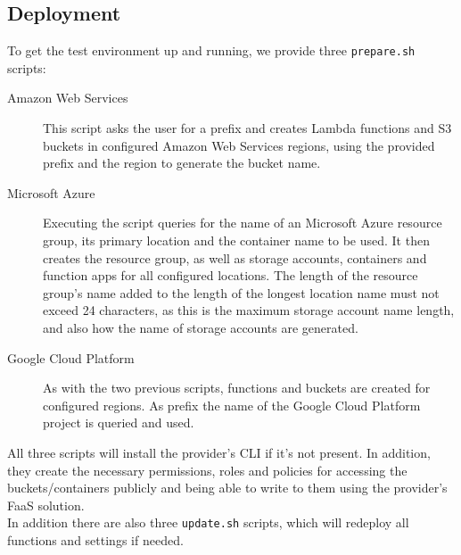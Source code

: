 \documentclass[a4paper,bibliography=totoc]{scrartcl}
\newcommand{\Azure}{Microsoft Azure\xspace}
\newcommand{\GCP}{Google Cloud Platform\xspace}
\newcommand{\AWS}{Amazon Web Services\xspace}
\begin{document}
\subsection{Deployment}
To get the test environment up and running, we provide three \texttt{prepare.sh} scripts:
\begin{description}
    \item[\AWS\cite{wb_aws_prepare}] This script asks the user for a prefix and creates Lambda functions\cite{aws_lambda} and S3 buckets in configured\cite{wb_aws_regions} \AWS regions, using the provided prefix and the region to generate the bucket name.
    \item[\Azure\cite{wb_azure_prepare}] Executing the script queries for the name of an \Azure resource group,\cite{azure_resouce_groups} its primary location and the container name to be used. It then creates the resource group, as well as storage accounts, containers and function apps\cite{azure_functions} for all configured\cite{wb_azure_regions} locations. The length of the resource group's name added to the length of the longest location name must not exceed 24 characters, as this is the maximum storage account name length,\cite{azure_storage_account} and also how the name of storage accounts are generated. 
    \item[\GCP\cite{wb_gcp_prepare}] As with the two previous scripts, functions\cite{gcp_functions} and buckets are created for configured\cite{wb_gcp_regions} regions. As prefix the name of the \GCP project\cite{gcp_projects} is queried and used.
\end{description}
All three scripts will install the provider's CLI if it's not present. In addition, they create the necessary permissions, roles and policies for accessing the buckets/containers publicly and being able to write to them using the provider's FaaS solution.\\
In addition there are also three \texttt{update.sh} scripts, which will redeploy all functions and settings if needed.\cite{wb_aws_update,wb_azure_update,wb_gcp_update}
\end{document}
